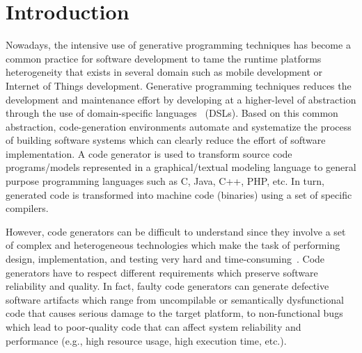 \section{Introduction}
Nowadays, the intensive use of generative programming techniques has become a common practice for software development to tame the runtime platforms heterogeneity that exists in several domain such as mobile development or Internet of Things development.  Generative programming techniques reduces the development and maintenance effort by developing at a higher-level of abstraction through the use of domain-specific languages~\cite{brambilla2012model} (DSLs). 
Based on this common abstraction, code-generation environments automate and systematize the process of building software systems which can clearly reduce the effort of software implementation.
A code generator is used to transform source code programs/models represented in a graphical/textual modeling language to general purpose programming languages such as C, Java, C++, PHP, etc. In turn, generated code is transformed into machine code (binaries) using a set of specific compilers.


However, code generators can be difficult to understand since they involve a set of complex and heterogeneous technologies which make the task of performing design, implementation, and testing very hard and time-consuming~\cite{france2007model,guana2015developers}. Code generators have to respect different requirements which preserve software reliability and quality. In fact, faulty code generators can generate defective software artifacts which range from uncompilable or semantically dysfunctional code that causes serious damage to the target platform, to non-functional bugs which lead to poor-quality code that can affect system reliability and performance (e.g., high resource usage, high execution time, etc.). 


